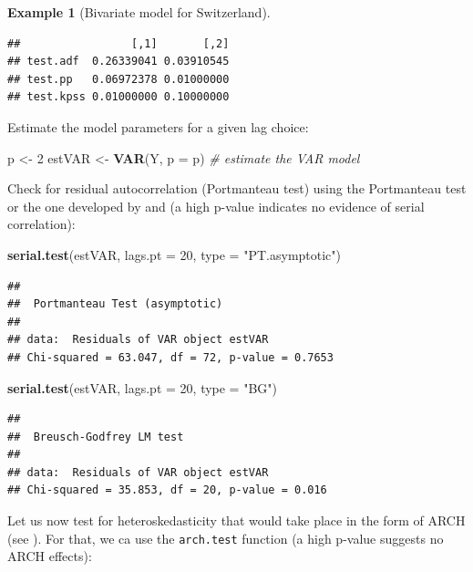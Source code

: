 \documentclass[
  11pt,
]{book}
\newenvironment{Shaded}{\begin{snugshade}}{\end{snugshade}}
\newcommand{\AttributeTok}[1]{\textcolor[rgb]{0.13,0.29,0.53}{#1}}
\newcommand{\CommentTok}[1]{\textcolor[rgb]{0.56,0.35,0.01}{\textit{#1}}}
\newcommand{\DecValTok}[1]{\textcolor[rgb]{0.00,0.00,0.81}{#1}}
\newcommand{\FunctionTok}[1]{\textcolor[rgb]{0.13,0.29,0.53}{\textbf{#1}}}
\newcommand{\NormalTok}[1]{#1}
\newcommand{\OtherTok}[1]{\textcolor[rgb]{0.56,0.35,0.01}{#1}}
\newcommand{\StringTok}[1]{\textcolor[rgb]{0.31,0.60,0.02}{#1}}
\theoremstyle{definition}
\theoremstyle{definition}
\newtheorem{example}{Example}[chapter]
\theoremstyle{definition}
\theoremstyle{definition}
\theoremstyle{remark}
\begin{document}
\begin{example}[Bivariate model for Switzerland]
\begin{verbatim}
##                 [,1]       [,2]
## test.adf  0.26339041 0.03910545
## test.pp   0.06972378 0.01000000
## test.kpss 0.01000000 0.10000000
\end{verbatim}

Estimate the model parameters for a given lag choice:

\begin{Shaded}
\begin{Highlighting}[]
\NormalTok{p }\OtherTok{\textless{}{-}} \DecValTok{2}
\NormalTok{estVAR }\OtherTok{\textless{}{-}} \FunctionTok{VAR}\NormalTok{(Y, }\AttributeTok{p =}\NormalTok{ p) }\CommentTok{\# estimate the VAR model}
\end{Highlighting}
\end{Shaded}

Check for residual autocorrelation (Portmanteau test) using the Portmanteau test or the one developed by \citet{Breusch_1978} and \citet{Godfrey_1978} (a high p-value indicates no evidence of serial correlation):

\begin{Shaded}
\begin{Highlighting}[]
\FunctionTok{serial.test}\NormalTok{(estVAR, }\AttributeTok{lags.pt =} \DecValTok{20}\NormalTok{, }\AttributeTok{type =} \StringTok{"PT.asymptotic"}\NormalTok{)}
\end{Highlighting}
\end{Shaded}

\begin{verbatim}
## 
##  Portmanteau Test (asymptotic)
## 
## data:  Residuals of VAR object estVAR
## Chi-squared = 63.047, df = 72, p-value = 0.7653
\end{verbatim}

\begin{Shaded}
\begin{Highlighting}[]
\FunctionTok{serial.test}\NormalTok{(estVAR, }\AttributeTok{lags.pt =} \DecValTok{20}\NormalTok{, }\AttributeTok{type =} \StringTok{"BG"}\NormalTok{)}
\end{Highlighting}
\end{Shaded}

\begin{verbatim}
## 
##  Breusch-Godfrey LM test
## 
## data:  Residuals of VAR object estVAR
## Chi-squared = 35.853, df = 20, p-value = 0.016
\end{verbatim}

Let us now test for heteroskedasticity that would take place in the form of ARCH (see \citet{Engle_1982}). For that, we ca use the \texttt{arch.test} function (a high p-value suggests no ARCH effects):


\end{example}
\end{document}
